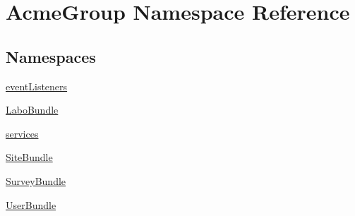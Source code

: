 \hypertarget{namespace_acme_group}{\section{Acme\+Group Namespace Reference}
\label{namespace_acme_group}
}
\subsection*{Namespaces}
\begin{DoxyCompactItemize}
\item 
 \hyperlink{namespace_acme_group_1_1event_listeners}{event\+Listeners}
\item 
 \hyperlink{namespace_acme_group_1_1_labo_bundle}{Labo\+Bundle}
\item 
 \hyperlink{namespace_acme_group_1_1services}{services}
\item 
 \hyperlink{namespace_acme_group_1_1_site_bundle}{Site\+Bundle}
\item 
 \hyperlink{namespace_acme_group_1_1_survey_bundle}{Survey\+Bundle}
\item 
 \hyperlink{namespace_acme_group_1_1_user_bundle}{User\+Bundle}
\end{DoxyCompactItemize}
